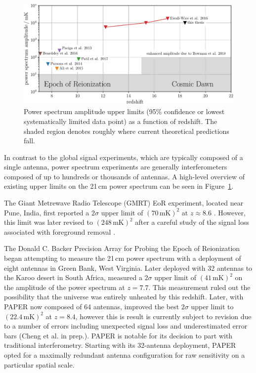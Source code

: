 \begin{bibunit}
\begin{figure}[t]
    \centering
    \includegraphics[width=\textwidth]{figures/chapter1/power-spectrum-upper-limits/power-spectrum-upper-limits}
    \caption{
        Power spectrum amplitude upper limits (95\% confidence or lowest systematically limited data
        point) as a function of redshift. The shaded region denotes roughly where current
        theoretical predictions fall.
    }
    \label{fig:power-spectrum-upper-limits}
\end{figure}

In contrast to the global signal experiments, which are typically composed of a single antenna,
power spectrum experiments are generally interferometers composed of up to hundreds or thousands of
antennas. A high-level overview of existing upper limits on the 21\,cm power spectrum can be seen in
Figure~\ref{fig:power-spectrum-upper-limits}.

The Giant Metrewave Radio Telescope (GMRT) EoR experiment, located near Pune, India, first reported
a $2\sigma$ upper limit of $(70\,\text{mK})^2$ at $z \approx 8.6$ \citep{2011MNRAS.413.1174P}.
However, this limit was later revised to $(248\,\text{mK})^2$ after a careful study of the signal
loss associated with foreground removal \citep{2013MNRAS.433..639P}.

The Donald C. Backer Precision Array for Probing the Epoch of Reionization
\citep[PAPER;][]{2010AJ....139.1468P} began attempting to measure the 21\,cm power spectrum with a
deployment of eight antennas in Green Bank, West Virginia. Later deployed with 32 antennas to the
Karoo desert in South Africa, \citet{2014ApJ...788..106P} measured a $2\sigma$ upper limit of
$(41\,\text{mK})^2$ on the amplitude of the power spectrum at $z=7.7$. This measurement ruled out
the possibility that the universe was entirely unheated by this redshift.  Later, with PAPER now
composed of 64 antennas, \citet{2015ApJ...809...61A} improved the best $2\sigma$ upper limit to
$(22.4\,\text{mK})^2$ at $z=8.4$, however this is result is currently subject to revision due to a
number of errors including unexpected signal loss and underestimated error bars (Cheng et al. in
prep.). PAPER is notable for its decision to part with traditional interferometry. Starting with its
32-antenna deployment, PAPER opted for a maximally redundant antenna configuration for raw
sensitivity on a particular spatial scale.


\end{bibunit}
